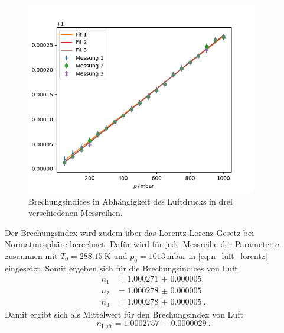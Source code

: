 \begin{figure}
    \centering
    \includegraphics[width=0.9\textwidth]{python/index.png}
    \caption{Brechungsindices in Abhängigkeit des Luftdrucks in drei verschiedenen Messreihen.}
    \label{fig:luft}
\end{figure}
Der Brechungsindex wird zudem über das Lorentz-Lorenz-Gesetz bei Normatmosphäre berechnet.
Dafür wird für jede Messreihe der Parameter $a$ zusammen mit $T_0 = \qty{288.15}{\kelvin}$ und $p_0 = \qty{1013}{\milli\bar}$ in \autoref{eq:n_luft_lorentz} eingesetzt.
Somit ergeben sich für die Brechungsindices von Luft
\begin{align*}
    n_1 &= \qty{1.000271(5)}{} \\
    n_2 &= \qty{1.000278(5)}{} \\
    n_3 &= \qty{1.000278(5)}{}.
\end{align*}
Damit ergibt sich als Mittelwert für den Brechungsindex von Luft
\begin{equation*}
    n_\text{Luft} = \qty{1.0002757(29)}{}.
\end{equation*}